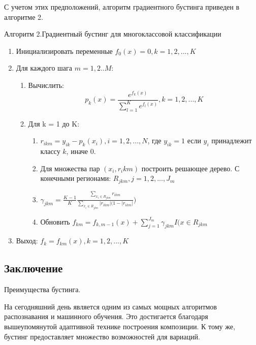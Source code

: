 С учетом этих предположений, алгоритм градиентного бустинга приведен в алгоритме 2.


\begin{algorithm}
  \caption{Алгоритм 2.Градиентный бустинг для многоклассовой классификации}
  \label{gradient-boosting-algorithm}
  \begin{enumerate}
  \item Инициализировать переменные $f_0(x)=0, k=1,2,...,K$
  \item Для каждого шага $m=1,2 .. M$:
    \begin{enumerate}
      \item Вычислить:
      \begin{equation}
      	p_k(x)=\frac{e^{f_k(x)}}{\sum_{l=1}^{K}e^{f_l(x)}}, k=1,2,...,K
      \end{equation}
      \item Для k = 1 до K:
      \begin{enumerate}
      	\item $r_{ikm}=y_{ik}-p_k(x_i), i=1,2,...,N$, где $y_{ik}=1$ если $y_i$ принадлежит классу $k$, иначе 0.
      	\item Для множества пар $(x_i,r_ikm)$ построить решающее дерево. С конечными регионами: $R_{jkm}, j=1,2,...,J_m$
      	\item $\gamma_{jkm}=\frac{K-1}{K}\frac{\sum_{x_i\in R_{jkm}}r_{ikm}}{\sum_{x_i\in R_{jkm}}|r_{ikm}|(1-|r_{ikm}|})$
      	\item Обновить $f_{km}=f_{k,m-1}(x)+\sum_{j=1}^{J_m}\gamma_{jkm}I(x\in R_{jkm}$
      \end{enumerate}
    \end{enumerate}
    \item Выход: $f_k=f_{km}(x), k=1,2,...,K$
  \end{enumerate}
\end{algorithm}

\subsection{Заключение}


Преимущества бустинга.


На сегодняшний день является одним из самых мощных алгоритмов распознавания и машинного обучения. Это достигается благодаря вышеупомянутой адаптивной технике построения композиции. К тому же, бустинг предоставляет множество возможностей для вариаций. 

